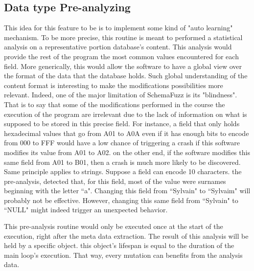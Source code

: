 \documentclass{article}
\begin{document}
\begin{empfile}
		\subsection{Data type Pre-analyzing}
This idea for this feature to be is to implement some kind of "auto learning" mechanism.
To be more precise, this routine is meant to performed a statistical analysis on a representative portion database's content. This analysis would provide the rest of the program the most common values encountered for each field. More generically, this would allow the software to have a global view over the format of the data that the database holds.
Such global understanding of the content format is   interesting to make the modifications possibilities more relevant. Indeed, one of the major limitation of SchemaFuzz is its "blindness".
That is to say that some of the modifications performed in the course the execution of the program are irrelevant due to the lack of information on what is supposed to be stored in this precise field.
For instance, a field that only holds hexadecimal values that go from A01 to A0A even if it has enough bits to encode from 000 to FFF would have a low chance of triggering a crash if this software modifies its value from A01 to A02.
on the other end, if the software modifies this same field from A01 to B01, then a crash is much more likely to be discovered.
Same principle applies to strings. Suppose a field can encode 10 characters.
the pre-analysis, detected that, for this field, most of the value were surnames beginning with the letter  “a". Changing this field from  “Sylvain" to  “Sylvaim" will probably not be effective. However, changing this same field from  “Sylvain" to  “NULL" might indeed trigger an unexpected behavior. 
  
This pre-analysis routine would only be executed once at the start of the execution, right after the meta data extraction. The result of this analysis will be held by a specific object. 
this object's lifespan is equal to the duration of the main loop's execution. That way, every mutation can benefits from the analysis data.
		

\end{empfile}
\end{document}
